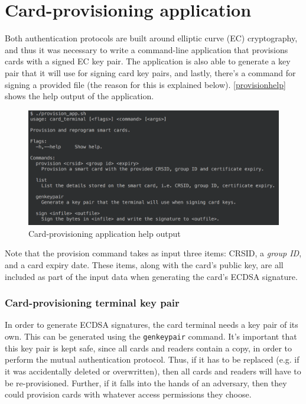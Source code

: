 \documentclass[12pt,a4paper,twoside,openright]{report}
\begin{document}
\section{Card-provisioning application}
\label{provisionapp}

Both authentication protocols are built around elliptic curve (EC) cryptography, and thus it was necessary to write a command-line application that provisions cards with a signed EC key pair. The application is also able to generate a key pair that it will use for signing card key pairs, and lastly, there's a command for signing a provided file (the reason for this is explained below). \autoref{provisionhelp} shows the help output of the application.

\begin{figure}[tbh]
\centerline{\includegraphics[scale=0.7]{figures/provisionhelp.png}}
\caption{Card-provisioning application help output}
\label{provisionhelp}
\end{figure}

Note that the provision command takes as input three items: CRSID, a \emph{group ID}, and a card expiry date. These items, along with the card's public key, are all included as part of the input data when generating the card's ECDSA signature.

\subsubsection{Card-provisioning terminal key pair}

In order to generate ECDSA signatures, the card terminal needs a key pair of its own. This can be generated using the \texttt{genkeypair} command. It's important that this key pair is kept safe, since all cards and readers contain a copy, in order to perform the mutual authentication protocol. Thus, if it has to be replaced (e.g. if it was accidentally deleted or overwritten), then all cards and readers will have to be re-provisioned. Further, if it falls into the hands of an adversary, then they could provision cards with whatever access permissions they choose.
\end{document}
